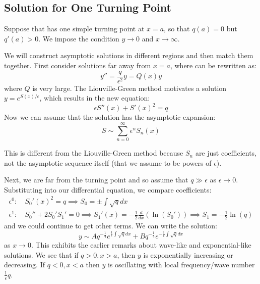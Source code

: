 \documentclass[../Main.tex]{subfiles}
\begin{document}
\subsection{Solution for One Turning Point}
Suppose that  has one simple turning point at $x = a$, so that $q(a) = 0$ but $q'(a) > 0$. We impose the condition $y \to 0$ and $x \to \infty$.

We will construct asymptotic solutions in different regions and then match them together. First consider solutions far away from $x = a$, where  can be rewritten as:
\begin{equation*}
    y'' = \frac{q}{\epsilon^2} y = Q(x) y
\end{equation*}
where $Q$ is very large. The Liouville-Green method motivates a solution $y = e^{S(x) / \epsilon}$, which results in the new equation:
\begin{equation*}
    \epsilon S''(x) + S'(x)^2 = q
\end{equation*}
Now we can assume that the solution has the asymptotic expansion:
\begin{equation*}
    S\sim \sum_{n = 0}^\infty \epsilon^n S_n(x)
\end{equation*}
\begin{remark}
    This is different from the Liouville-Green method because $S_n$ are just coefficients, not the asymptotic sequence itself (that we assume to be powers of $\epsilon$).
\end{remark}

Next, we are far from the turning point and so assume that $q \gg \epsilon$ as $\epsilon \to 0$. Substituting into our differential equation, we compare coefficients:
\begin{align*}
    \epsilon^0:&~ S_0'(x)^2 = q \implies S_0 = \pm \int \sqrt{q} dx \\
    \epsilon^1:&~ S_0'' + 2S_0' S_1' = 0 \implies S_1'(x) = -\frac12 \frac{d}{dx}(\ln(S_0')) \implies S_1 = -\frac12 \ln(q)
\end{align*}
and we could continue to get other terms. We can write the solution:
\begin{equation*}
    y \sim A q^{-\frac14} e^{\frac1\epsilon \int \sqrt{q} dx} + Bq^{-\frac14} e^{-\frac1\epsilon \int\sqrt{q} dx}
\end{equation*}
as $x \to 0$. This exhibits the earlier remarks about wave-like and exponential-like solutions. We see that if $q > 0, x > a$, then $y$ is exponentially increasing or decreasing. If $q < 0, x < a$ then $y$ is oscillating with local frequency/wave number $\frac1\epsilon q$.
\end{document}
